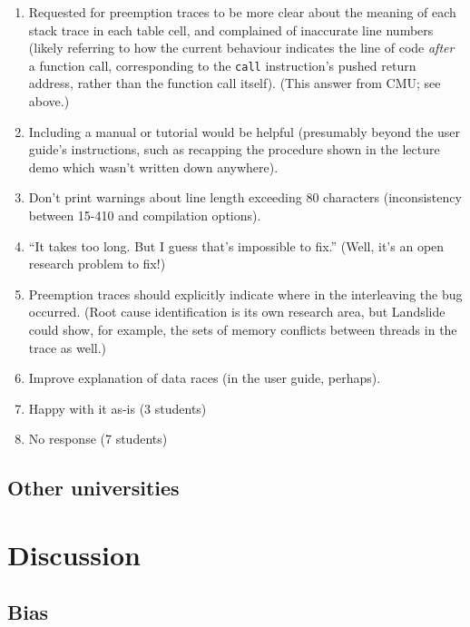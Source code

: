 \begin{enumerate}
	\item Requested for preemption traces to be more clear about the meaning of each stack trace in each table cell,
		and complained of inaccurate line numbers
		(likely referring to how the current behaviour indicates the line of code {\em after} a function call,
		corresponding to the {\tt call} instruction's pushed return address,
		rather than the function call itself). (This answer from CMU; see above.)
	\item Including a manual or tutorial would be helpful (presumably beyond the user guide's instructions, such as recapping the procedure shown in the lecture demo which wasn't written down anywhere).
	\item Don't print warnings about line length exceeding 80 characters (inconsistency between 15-410 and \psuos compilation options).
	\item ``It takes too long. But I guess that's impossible to fix.'' (Well, it's an open research problem to fix!)
	\item Preemption traces should explicitly indicate where in the interleaving the bug occurred.
		(Root cause identification is its own research area,
		but Landslide could show, for example, the sets of memory conflicts between threads in the trace as well.)
	\item Improve explanation of data races (in the user guide, perhaps).
	\item Happy with it as-is (3 students)
	\item No response (7 students)
\end{enumerate}

\subsection{Other universities}



\section{Discussion}


\subsection{Bias}

